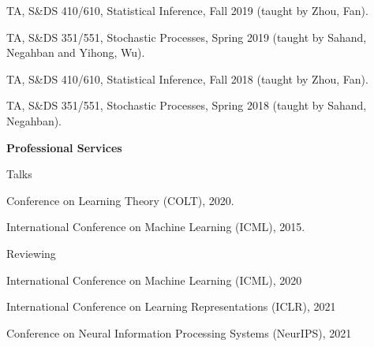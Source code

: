 \documentclass{article}
\begin{document}
\vspace{2mm}
TA, S\&{DS} 410/610, Statistical Inference, Fall 2019 (taught by Zhou, Fan). 

\vspace{2mm}
TA, S\&{DS} 351/551, Stochastic Processes, Spring 2019 (taught by Sahand, Negahban and Yihong, Wu). 

\vspace{2mm}
TA, S\&{DS} 410/610, Statistical Inference, Fall 2018 (taught by Zhou, Fan). 

\vspace{2mm}
TA, S\&{DS} 351/551, Stochastic Processes, Spring 2018 (taught by Sahand, Negahban). 



\vspace{5mm}
\begin{large}
\noindent \textbf{Professional Services}
\end{large}
\vspace{5mm}

\begin{large}
\noindent Talks
\end{large}


\vspace{2mm}
Conference on Learning Theory (COLT), 2020.

\vspace{2mm}
International Conference on Machine Learning (ICML), 2015.



\vspace{2mm}

\begin{large}
\noindent Reviewing
\end{large}


\vspace{2mm}
International Conference on Machine Learning (ICML), 2020

\vspace{2mm}
International Conference on Learning Representations (ICLR), 2021

\vspace{2mm}
Conference on Neural Information Processing Systems (NeurIPS), 2021


\end{document}
